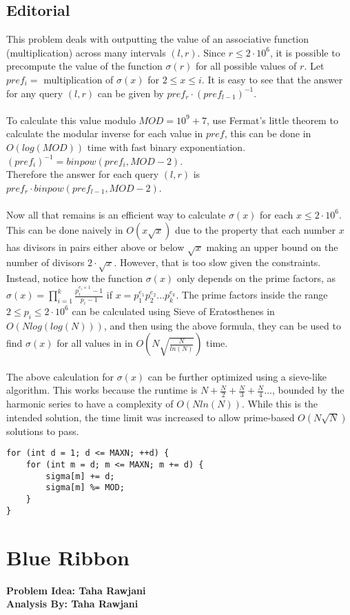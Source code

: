 \documentclass{article}
\begin{document}
\subsection{Editorial}
This problem deals with outputting the value of an associative function (multiplication) across many intervals $(l, r)$. Since $r \leq 2\cdot10^6$, it is possible to precompute the value of the function $\sigma(r)$ for all possible values of $r$. Let $pref_i = $ multiplication of $\sigma(x)$ for $2\leq x \leq i$. It is easy to see that the answer for any query $(l, r)$ can be given by $pref_r \cdot (pref_{l-1})^{-1}$. 
\\\\
To calculate this value modulo $MOD = 10^9 + 7$, use Fermat's little theorem to calculate the modular inverse for each value in $pref$, this can be done in $O(log(MOD))$ time with fast binary exponentiation.
\\$(pref_{i})^{-1} = binpow(pref_{i}, MOD-2)$. 
\\Therefore the answer for each query $(l, r)$ is $pref_r \cdot binpow(pref_{l-1}, MOD-2)$. 
\\\\
Now all that remains is an efficient way to calculate $\sigma(x)$ for each $x \leq 2\cdot10^6$. This can be done naively in $O(x\sqrt{x})$ due to the property that each number $x$ has divisors in pairs either above or below $\sqrt{x}$ making an upper bound on the number of divisors $2\cdot\sqrt{x}$. However, that is too slow given the constraints. Instead, notice how the function $\sigma(x)$ only depends on the prime factors, as $\sigma(x) = \prod_{i=1}^{k} \frac{p_i^{e_i+1} - 1}{p_i - 1}$ if $x = p_1^{e_1} p_2^{e_2} \dots p_k^{e_k}$. The prime factors inside the range $2 \leq p_i\leq 2\cdot10^6$ can be calculated using Sieve of Eratosthenes in $O(Nlog(log(N)))$, and then using the above formula, they can be used to find $\sigma(x)$ for all values in  in $O(N\sqrt{\frac{N}{ln(N)}})$ time.
\\\\
The above calculation for $\sigma(x)$ can be further optimized using a sieve-like algorithm. This works because the runtime is $N+\frac{N}{2}+\frac{N}{3}+\frac{N}{4}\dots$, bounded by the harmonic series to have a complexity of $O(Nln(N))$. While this is the intended solution, the time limit was increased to allow prime-based $O(N\sqrt{N})$ solutions to pass.
\begin{lstlisting}
for (int d = 1; d <= MAXN; ++d) {
    for (int m = d; m <= MAXN; m += d) {
        sigma[m] += d;
        sigma[m] %= MOD;
    }
}
\end{lstlisting}
\section{Blue Ribbon}
\textbf{Problem Idea: Taha Rawjani\\Analysis By: Taha Rawjani}
\end{document}
